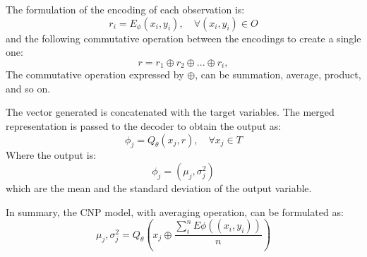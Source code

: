 The formulation of the encoding of each observation is:
\begin{equation}
r_i = E_\phi(x_i,y_i), \quad \forall(x_i,y_i) \in O
\end{equation}
and the following commutative operation between the encodings to create a single one: 
\begin{equation} \label{eq:commutative-operation}
    r = r_1 \oplus r_2 \oplus ... \oplus r_i,
\end{equation}
The commutative operation expressed by $\oplus$, can be summation, average, product, and so on. 

The vector generated is concatenated with the target variables. The merged representation is passed to the decoder to obtain the output as:
\begin{equation}
    \phi_j = Q_\theta(x_j, r), \quad \forall x_j \in T
\end{equation}
Where the output is: 
\begin{equation}
    \phi_j = (\mu_j, \sigma_j^2)
\end{equation}
which are the mean and the standard deviation of the output variable.

In summary, the CNP model, with averaging operation, can be formulated as: 
\begin{equation}
    \mu_j, \sigma_j^2 = Q_\theta \left( x_j \oplus \frac{ \sum_{i}^{n} E\phi((x_i,y_i)) }{n}  \right)
\end{equation}

